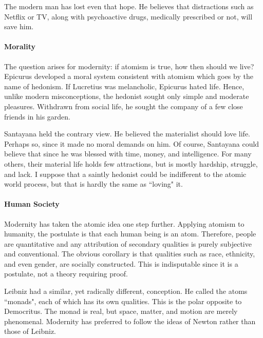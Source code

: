 The modern man has lost even that hope. He believes that distractions such as Netflix or TV, along with psychoactive drugs, medically prescribed or not, will save him.

\paragraph{Morality}
The question arises for modernity: if atomism is true, how then should we live? Epicurus developed a moral system consistent with atomism which goes by the name of hedonism. If Lucretius was melancholic, Epicurus hated life. Hence, unlike modern misconceptions, the hedonist sought only simple and moderate pleasures. Withdrawn from social life, he sought the company of a few close friends in his garden.

Santayana held the contrary view. He believed the materialist should love life. Perhaps so, since it made no moral demands on him. Of course, Santayana could believe that since he was blessed with time, money, and intelligence. For many others, their material life holds few attractions, but is mostly hardship, struggle, and lack. I suppose that a saintly hedonist could be indifferent to the atomic world process, but that is hardly the same as ``loving" it.

\paragraph{Human Society}
Modernity has taken the atomic idea one step further. Applying atomism to humanity, the postulate is that each human being is an atom. Therefore, people are quantitative and any attribution of secondary qualities is purely subjective and conventional. The obvious corollary is that qualities such as race, ethnicity, and even gender, are socially constructed. This is indisputable since it is a postulate, not a theory requiring proof.

Leibniz had a similar, yet radically different, conception. He called the atoms ``monads", each of which has its own qualities. This is the polar opposite to Democritus. The monad is real, but space, matter, and motion are merely phenomenal. Modernity has preferred to follow the ideas of Newton rather than those of Leibniz.



